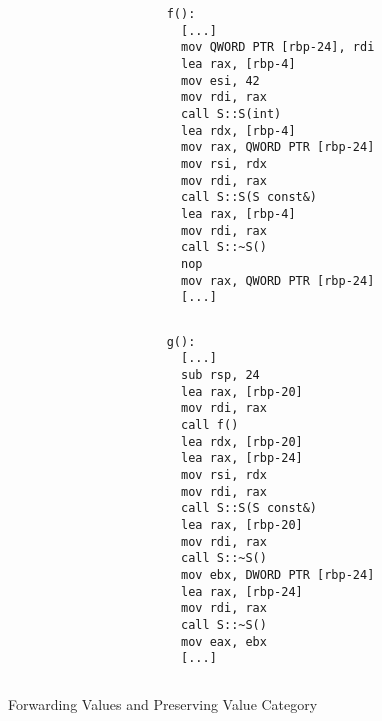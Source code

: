 \documentclass[compress,aspectratio=1610]{beamer}
\newcommand{\inputcpplisting}[1]{}
\begin{document}
\begin{frame}[fragile]
    \begin{columns}
        \begin{column}{.5\textwidth}
            \inputcpplisting{snippet7}
        \end{column}
        \begin{column}{.4\textwidth}
            \begin{lstlisting}[language={},morekeywords={rdi}]
f():
  [...]
  mov QWORD PTR [rbp-24], rdi
  lea rax, [rbp-4]
  mov esi, 42
  mov rdi, rax
  call S::S(int)
  lea rdx, [rbp-4]
  mov rax, QWORD PTR [rbp-24]
  mov rsi, rdx
  mov rdi, rax
  call S::S(S const&)
  lea rax, [rbp-4]
  mov rdi, rax
  call S::~S()
  nop
  mov rax, QWORD PTR [rbp-24]
  [...]
            \end{lstlisting}
        \end{column}
    \end{columns}
\end{frame}

\begin{frame}[fragile]
    \begin{columns}
        \begin{column}{.5\textwidth}
            \inputcpplisting{snippet7}
        \end{column}
        \begin{column}{.4\textwidth}
            \begin{lstlisting}[language={},morekeywords={rdi}]
g():
  [...]
  sub rsp, 24
  lea rax, [rbp-20]
  mov rdi, rax
  call f()
  lea rdx, [rbp-20]
  lea rax, [rbp-24]
  mov rsi, rdx
  mov rdi, rax
  call S::S(S const&)
  lea rax, [rbp-20]
  mov rdi, rax
  call S::~S()
  mov ebx, DWORD PTR [rbp-24]
  lea rax, [rbp-24]
  mov rdi, rax
  call S::~S()
  mov eax, ebx
  [...]
            \end{lstlisting}
        \end{column}
    \end{columns}
\end{frame}

\begin{frame}[fragile]{Forwarding Values and Preserving Value Category}
    \centering


    \only<1>{\inputcpplisting{snippet11a}}%
    \only<2>{\inputcpplisting{snippet11b}}%
    \only<3>{\inputcpplisting{snippet11c}}%
\end{frame}
\end{document}
